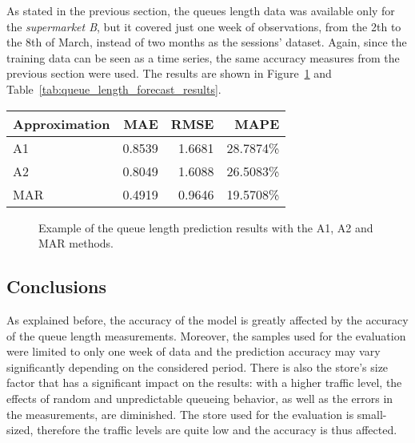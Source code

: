 As stated in the previous section, the queues length data was available only for the \emph{supermarket B}, but it covered just one week of observations, from the 2th to the 8th of March, instead of two months as the sessions' dataset. Again, since the training data can be seen as a time series, the same accuracy measures from the previous section were used. The results are shown in Figure~\ref{fig:queue_length_forecast} and Table~\ref{tab:queue_length_forecast_results}.

\begin{center}
  \begin{tabular}{ l r r r }
    \hline
    Approximation & MAE    & RMSE   & MAPE      \\
    \hline
    A1            & 0.8539 & 1.6681 & 28.7874\% \\
    A2            & 0.8049 & 1.6088 & 26.5083\% \\
    MAR           & 0.4919 & 0.9646 & 19.5708\% \\
    \hline
  \end{tabular}
\end{center}

\begin{figure}
  \begin{center}
  \end{center}
  \caption{Example of the queue length prediction results with the A1, A2 and MAR methods.}
  \label{fig:queue_length_forecast}
\end{figure}

\subsection{Conclusions}
\label{subsec:queue_length_forecast_results_conclusions}

As explained before, the accuracy of the model is greatly affected by the accuracy of the queue length measurements. Moreover, the samples used for the evaluation were limited to only one week of data and the prediction accuracy may vary significantly depending on the considered period. There is also the store’s size factor that has a significant impact on the results: with a higher traffic level, the effects of random and unpredictable queueing behavior, as well as the errors in the measurements, are diminished. The store used for the evaluation is small-sized, therefore the traffic levels are quite low and the accuracy is thus affected.

\medskip
\clearpage